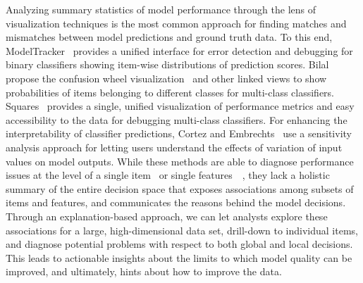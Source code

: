 Analyzing summary statistics of model performance through the lens of visualization techniques is the most common approach for finding matches and mismatches between model predictions and ground truth data. To this end, ModelTracker~\cite{amershi15} provides a unified interface for error detection and debugging for binary classifiers showing item-wise distributions of prediction scores. Bilal \etal propose the confusion wheel visualization~\cite{alsallakh2014visual} and other linked views to show probabilities of items belonging to different classes for multi-class classifiers.  Squares~\cite{ren2017squares} provides a single, unified visualization of performance metrics and easy accessibility to the data for debugging multi-class classifiers. For enhancing the interpretability of classifier predictions, Cortez and Embrechts~\cite{cortez2011opening} use a sensitivity analysis approach for letting users understand the effects of variation of input values on model outputs. While these methods are able to diagnose performance issues 
at the level of a single item~\cite{alsallakh2014visual,amershi15,ren2017squares} or single features~~\cite{cortez2011opening}, they lack a holistic summary of the entire decision space that exposes associations among subsets of items and features, and communicates the reasons behind the model decisions. Through an explanation-based approach, we can let analysts explore these associations for a large, high-dimensional data set, drill-down to individual items, and diagnose potential problems with respect to both global and local decisions. This leads to actionable insights about the limits to which model quality can be improved, and ultimately, hints about how to improve the data.


